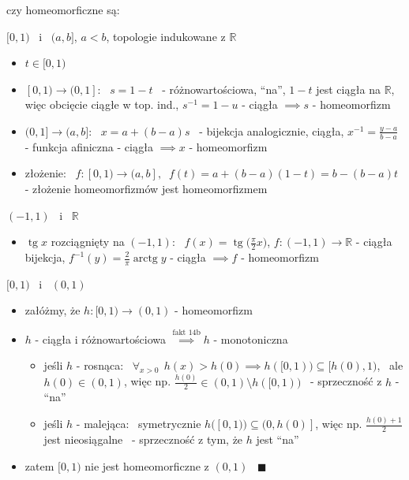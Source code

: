 \documentclass[a4paper,12pt]{article}
\begin{document}
\bigskip
{} \; czy homeomorficzne są:
\begin{podpunkty}
    \item \([0, 1)\) \, i \, \((a, b]\), \; \(a < b\), \; topologie indukowane z \(\mathbb{R}\)
    \begin{itemize}
        \item \(t \in [0, 1)\)
        \item \([0, 1) \to (0, 1]\): \, \(s = 1 - t\) \, - różnowartościowa, \enquote{na}, \(1 - t\) jest ciągła na \(\mathbb{R}\), więc obcięcie ciągłe w top. ind., \; \(s^{-1} = 1 - u\) - ciągła \(\implies s\) - homeomorfizm
        \item \((0, 1] \to (a, b]\): \, \(x = a + (b - a)s\) \, - bijekcja analogicznie, ciągła, \; \(x^{-1} = \frac{y - a}{b - a}\) - funkcja afiniczna - ciągła \(\implies x\) - homeomorfizm
        \item złożenie: \, \(f: [0, 1) \to (a, b], \;\; f(t) = a + (b - a)(1 - t) = b - (b - a)t\)\; - złożenie homeomorfizmów jest homeomorfizmem
    \end{itemize}
    \item \((-1, 1)\) \, i \, \(\mathbb{R}\)
    \begin{itemize}
        \item \(\operatorname{tg} x\) rozciągnięty na \((-1, 1)\): \, \(f(x) = \operatorname{tg}\big(\frac{\pi}{2} x\big)\), \; \(f: (-1, 1) \to \mathbb{R}\) - ciągła bijekcja, \; \(f^{-1}(y) = \frac{2}{\pi} \operatorname{arctg} y\) - ciągła \(\implies f\) - homeomorfizm
    \end{itemize}
    \item \([0, 1)\) \, i \, \((0, 1)\)
    \begin{itemize}
        \item załóżmy, że \(h: [0, 1) \to (0, 1)\) - homeomorfizm
        \item \(h\) - ciągła i różnowartościowa \(\overset{\text{fakt 14b}}{\implies} h\) - monotoniczna
        \begin{itemize}
            \item jeśli \(h\) - rosnąca: \, \(\forall_{x > 0} \;\, h(x) > h(0) \implies h([0, 1)) \subseteq [h(0), 1)\), \, ale \(h(0) \in (0, 1)\), więc np. \(\frac{h(0)}{2} \in (0, 1) \setminus h([0, 1))\) \, - sprzeczność z \(h\) - \enquote{na}
            \item jeśli \(h\) - malejąca: \, symetrycznie \(h([0, 1)) \subseteq (0, h(0)]\), więc np. \(\frac{h(0) + 1}{2}\) jest nieosiągalne \, - sprzeczność z tym, że \(h\) jest \enquote{na}
        \end{itemize}
        \item zatem \([0, 1)\) nie jest homeomorficzne z \((0, 1)\) \, \(\blacksquare\)
    \end{itemize}
\end{podpunkty}
\end{document}
